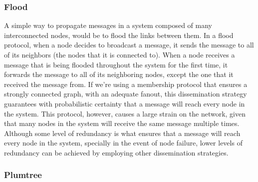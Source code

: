 \documentclass[sigconf]{acmart}
\begin{document}
\subsubsection{Flood} 
A simple way to propagate messages in a system composed of many interconnected nodes, would be to flood the links between them. In a flood protocol, when a node decides to broadcast a message, it sends the message to all of its neighbors (the nodes that it is connected to). When a node receives a message that is being flooded throughout the system for the first time, it forwards the message to all of its neighboring nodes, except the one that it received the message from.
If we're using a membership protocol that ensures a strongly connected graph, with an adequate fanout, this dissemination strategy guarantees with probabilistic certainty that a message will reach every node in the system. 
This protocol, however, causes a large strain on the network, given that many nodes in the system will receive the same message multiple times. Although some level of redundancy is what ensures that a message will reach every node in the system, specially in the event of node failure, lower levels of redundancy can be achieved by employing other dissemination strategies.

\subsubsection{Plumtree}
\end{document}

